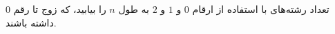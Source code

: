\p
تعداد رشته‌های با استفاده از ارقام 
$0$
و 
$1$
و 
$2$
به طول 
$n$
را بیابید، که زوج تا رقم 
$0$
داشته باشند.